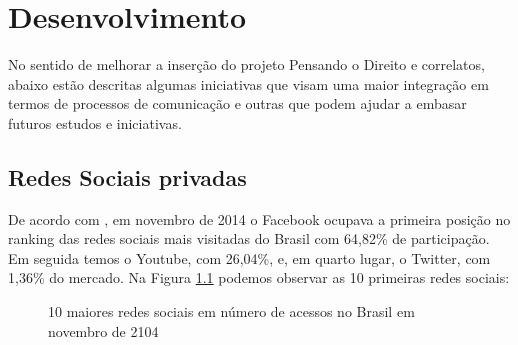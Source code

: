 \chapter{Desenvolvimento}
No sentido de melhorar a inserção do projeto Pensando o Direito e correlatos, 
abaixo estão descritas algumas iniciativas que visam uma maior integração em
termos de processos de comunicação e outras que podem ajudar a embasar futuros
estudos e iniciativas.

\section{Redes Sociais privadas}
De acordo com , em novembro de 2014 o Facebook ocupava a primeira posição no ranking das redes sociais mais visitadas do Brasil com 64,82\% de participação. Em seguida temos o Youtube, com 26,04\%, e, em quarto lugar, o Twitter, com 1,36\% do mercado. Na Figura \ref{fig:social-network-share-br} podemos observar as 10 primeiras redes sociais:
\begin{figure}[htb]%
	\begin{center}
	\end{center}%
	\caption{10 maiores redes sociais em número de acessos no Brasil em novembro de 2104\label{fig:social-network-share-br}}%
\end{figure}%

